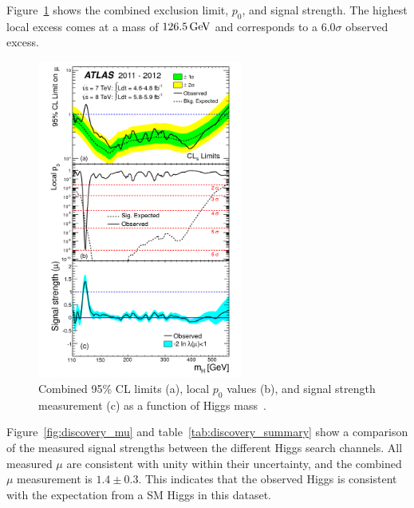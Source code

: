 Figure~\ref{fig:discovery_combined} shows the combined exclusion limit, $p_0$, and signal strength. The highest local excess comes at a mass of $126.5 \GeV$ and corresponds to a $6.0\sigma$ observed excess. 
%
\begin{figure}[t!]
  \centering
  \captionsetup{justification=centering}
  \includegraphics[width=0.6\textwidth]{figures/discovery_combined}
  \caption{Combined 95\% CL limits (a), local $p_0$ values (b), and signal strength measurement (c) as a function of Higgs mass~\cite{Discovery}.}
  \label{fig:discovery_combined}
\end{figure}
%
Figure~\ref{fig:discovery_mu} and table~\ref{tab:discovery_summary} show a comparison of the measured signal strengths between the different Higgs search channels. All measured $\mu$ are consistent with unity within their uncertainty, and the combined $\mu$ measurement is $1.4 \pm 0.3$. This indicates that the observed Higgs is consistent with the expectation from a SM Higgs in this dataset.  

